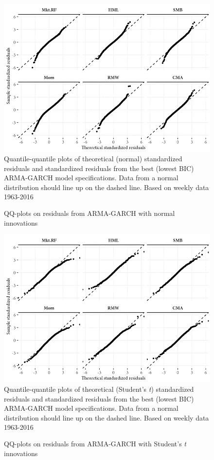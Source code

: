 \begin{figure}[H]
  \caption{QQ-plots on residuals from ARMA-GARCH with normal innovations}
  \label{fig:qq_norm}
  \centering
  \begin{minipage}{\textwidth}
  \includegraphics[scale=1]{graphics/qq_norm.png}  
  \vspace{3mm}
  \footnotesize
  Quantile-quantile plots of theoretical (normal) standardized residuals and standardized residuals from the best (lowest BIC) ARMA-GARCH model specifications. Data from a normal distribution should line up on the dashed line. Based on weekly data 1963-2016
  \end{minipage}
\end{figure}
\begin{figure}[H]
  \caption{QQ-plots on residuals from ARMA-GARCH with Student's \textit{t} innovations}
  \label{fig:qq_std}
  \centering
  \begin{minipage}{\textwidth}
  \includegraphics[scale=1]{graphics/qq_std.png}  
  \vspace{3mm}
  \footnotesize
  Quantile-quantile plots of theoretical (Student's \textit{t}) standardized residuals and standardized residuals from the best (lowest BIC) ARMA-GARCH model specifications. Data from a normal distribution should line up on the dashed line. Based on weekly data 1963-2016
  \end{minipage}
\end{figure}
